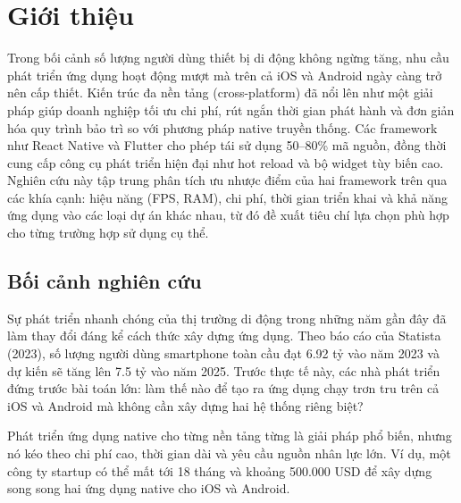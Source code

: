 
\section{Giới thiệu}
\begin{flushleft}  
    \hspace*{0.8cm}Trong bối cảnh số lượng người dùng thiết bị di động không ngừng tăng, nhu cầu phát triển ứng dụng hoạt động mượt mà trên cả iOS và Android ngày càng trở nên cấp thiết. Kiến trúc đa nền tảng (cross-platform) đã nổi lên như một giải pháp giúp doanh nghiệp tối ưu chi phí, rút ngắn thời gian phát hành và đơn giản hóa quy trình bảo trì so với phương pháp native truyền thống. Các framework như React Native và Flutter cho phép tái sử dụng 50--80\% mã nguồn, đồng thời cung cấp công cụ phát triển hiện đại như hot reload và bộ widget tùy biến cao. Nghiên cứu này tập trung phân tích ưu nhược điểm của hai framework trên qua các khía cạnh: hiệu năng (FPS, RAM), chi phí, thời gian triển khai và khả năng ứng dụng vào các loại dự án khác nhau, từ đó đề xuất tiêu chí lựa chọn phù hợp cho từng trường hợp sử dụng cụ thể.  
\end{flushleft}
    
\subsection{Bối cảnh nghiên cứu}
\renewcommand{\labelitemi}{--}    
\begin{flushleft}
    \hspace*{0.8cm}Sự phát triển nhanh chóng của thị trường di động trong những năm gần đây đã làm thay đổi đáng kể cách thức xây dựng ứng dụng. Theo báo cáo của Statista (2023), số lượng người dùng smartphone toàn cầu đạt 6.92 tỷ vào năm 2023 và dự kiến sẽ tăng lên 7.5 tỷ vào năm 2025. Trước thực tế này, các nhà phát triển đứng trước bài toán lớn: làm thế nào để tạo ra ứng dụng chạy trơn tru trên cả iOS và Android mà không cần xây dựng hai hệ thống riêng biệt?
\end{flushleft}

\begin{flushleft}
    \hspace*{0.8cm}Phát triển ứng dụng native cho từng nền tảng từng là giải pháp phổ biến, nhưng nó kéo theo chi phí cao, thời gian dài và yêu cầu nguồn nhân lực lớn. Ví dụ, một công ty startup có thể mất tới 18 tháng và khoảng 500.000 USD để xây dựng song song hai ứng dụng native cho iOS và Android.
\end{flushleft}

